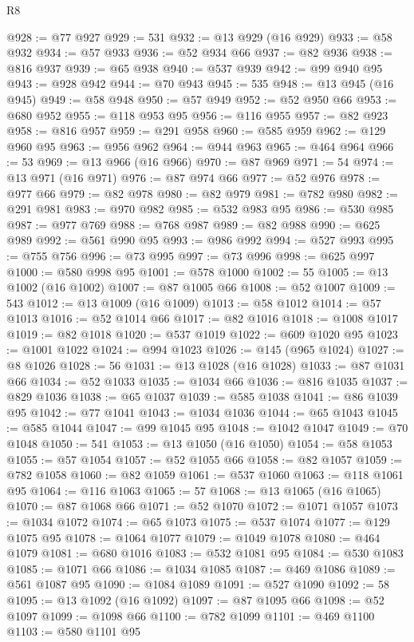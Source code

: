 \begin{lexlean}{R8}
\begin{coremodule}
@928 := @77 @927
@929 := 531
@932 := @13 @929 (@16 @929)
@933 := @58 @932
@934 := @57 @933
@936 := @52 @934 @66
@937 := @82 @936
@938 := @816 @937
@939 := @65 @938
@940 := @537 @939
@942 := @99 @940 @95
@943 := @928 @942
@944 := @70 @943
@945 := 535
@948 := @13 @945 (@16 @945)
@949 := @58 @948
@950 := @57 @949
@952 := @52 @950 @66
@953 := @680 @952
@955 := @118 @953 @95
@956 := @116 @955
@957 := @82 @923
@958 := @816 @957
@959 := @291 @958
@960 := @585 @959
@962 := @129 @960 @95
@963 := @956 @962
@964 := @944 @963
@965 := @464 @964
@966 := 53
@969 := @13 @966 (@16 @966)
@970 := @87 @969
@971 := 54
@974 := @13 @971 (@16 @971)
@976 := @87 @974 @66
@977 := @52 @976
@978 := @977 @66
@979 := @82 @978
@980 := @82 @979
@981 := @782 @980
@982 := @291 @981
@983 := @970 @982
@985 := @532 @983 @95
@986 := @530 @985
@987 := @977 @769
@988 := @768 @987
@989 := @82 @988
@990 := @625 @989
@992 := @561 @990 @95
@993 := @986 @992
@994 := @527 @993
@995 := @755 @756
@996 := @73 @995
@997 := @73 @996
@998 := @625 @997
@1000 := @580 @998 @95
@1001 := @578 @1000
@1002 := 55
@1005 := @13 @1002 (@16 @1002)
@1007 := @87 @1005 @66
@1008 := @52 @1007
@1009 := 543
@1012 := @13 @1009 (@16 @1009)
@1013 := @58 @1012
@1014 := @57 @1013
@1016 := @52 @1014 @66
@1017 := @82 @1016
@1018 := @1008 @1017
@1019 := @82 @1018
@1020 := @537 @1019
@1022 := @609 @1020 @95
@1023 := @1001 @1022
@1024 := @994 @1023
@1026 := @145 (@965 @1024)
@1027 := @8 @1026
@1028 := 56
@1031 := @13 @1028 (@16 @1028)
@1033 := @87 @1031 @66
@1034 := @52 @1033
@1035 := @1034 @66
@1036 := @816 @1035
@1037 := @829 @1036
@1038 := @65 @1037
@1039 := @585 @1038
@1041 := @86 @1039 @95
@1042 := @77 @1041
@1043 := @1034 @1036
@1044 := @65 @1043
@1045 := @585 @1044
@1047 := @99 @1045 @95
@1048 := @1042 @1047
@1049 := @70 @1048
@1050 := 541
@1053 := @13 @1050 (@16 @1050)
@1054 := @58 @1053
@1055 := @57 @1054
@1057 := @52 @1055 @66
@1058 := @82 @1057
@1059 := @782 @1058
@1060 := @82 @1059
@1061 := @537 @1060
@1063 := @118 @1061 @95
@1064 := @116 @1063
@1065 := 57
@1068 := @13 @1065 (@16 @1065)
@1070 := @87 @1068 @66
@1071 := @52 @1070
@1072 := @1071 @1057
@1073 := @1034 @1072
@1074 := @65 @1073
@1075 := @537 @1074
@1077 := @129 @1075 @95
@1078 := @1064 @1077
@1079 := @1049 @1078
@1080 := @464 @1079
@1081 := @680 @1016
@1083 := @532 @1081 @95
@1084 := @530 @1083
@1085 := @1071 @66
@1086 := @1034 @1085
@1087 := @469 @1086
@1089 := @561 @1087 @95
@1090 := @1084 @1089
@1091 := @527 @1090
@1092 := 58
@1095 := @13 @1092 (@16 @1092)
@1097 := @87 @1095 @66
@1098 := @52 @1097
@1099 := @1098 @66
@1100 := @782 @1099
@1101 := @469 @1100
@1103 := @580 @1101 @95

\end{coremodule}
\end{lexlean}
